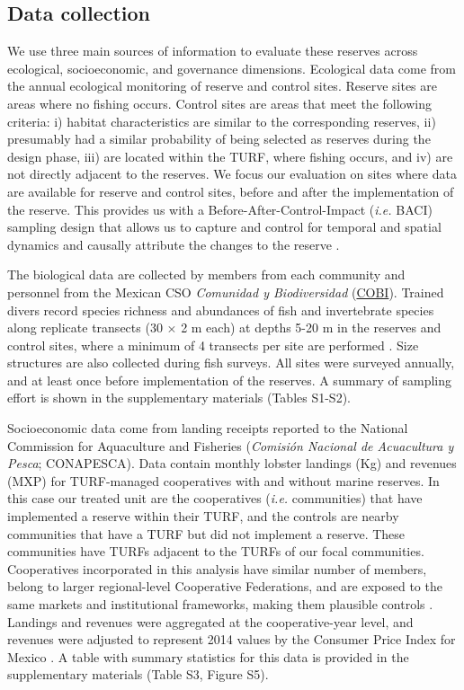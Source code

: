 \documentclass{frontiersSCNS}
\begin{document}
\hypertarget{data-collection}{%
\subsection{Data collection}\label{data-collection}}

We use three main sources of information to evaluate these reserves across ecological, socioeconomic, and governance dimensions. Ecological data come from the annual ecological monitoring of reserve and control sites. Reserve sites are areas where no fishing occurs. Control sites are areas that meet the following criteria: i) habitat characteristics are similar to the corresponding reserves, ii) presumably had a similar probability of being selected as reserves during the design phase, iii) are located within the TURF, where fishing occurs, and iv) are not directly adjacent to the reserves. We focus our evaluation on sites where data are available for reserve and control sites, before and after the implementation of the reserve. This provides us with a Before-After-Control-Impact (\emph{i.e.} BACI) sampling design that allows us to capture and control for temporal and spatial dynamics \citep{stewartoaten_1986,depalma_2018} and causally attribute the changes to the reserve \citep{francinifilho_2008,Villasenor-Derbez_2018}.

The biological data are collected by members from each community and personnel from the Mexican CSO \emph{Comunidad y Biodiversidad} (\href{www.cobi.org.mx}{COBI}). Trained divers record species richness and abundances of fish and invertebrate species along replicate transects (30 \(\times\) 2 m each) at depths 5-20 m in the reserves and control sites, where a minimum of 4 transects per site are performed \citep{suman_2010-ez,fulton_2018,fulton_2019}. Size structures are also collected during fish surveys. All sites were surveyed annually, and at least once before implementation of the reserves. A summary of sampling effort is shown in the supplementary materials (Tables S1-S2).

Socioeconomic data come from landing receipts reported to the National Commission for Aquaculture and Fisheries (\emph{Comisión Nacional de Acuacultura y Pesca}; CONAPESCA). Data contain monthly lobster landings (Kg) and revenues (MXP) for TURF-managed cooperatives with and without marine reserves. In this case our treated unit are the cooperatives (\emph{i.e.} communities) that have implemented a reserve within their TURF, and the controls are nearby communities that have a TURF but did not implement a reserve. These communities have TURFs adjacent to the TURFs of our focal communities. Cooperatives incorporated in this analysis have similar number of members, belong to larger regional-level Cooperative Federations, and are exposed to the same markets and institutional frameworks, making them plausible controls \citep{mccay_2014,mccay_2017,ayer_2018}. Landings and revenues were aggregated at the cooperative-year level, and revenues were adjusted to represent 2014 values by the Consumer Price Index for Mexico \citep{oecd_2017}. A table with summary statistics for this data is provided in the supplementary materials (Table S3, Figure S5).
\end{document}
